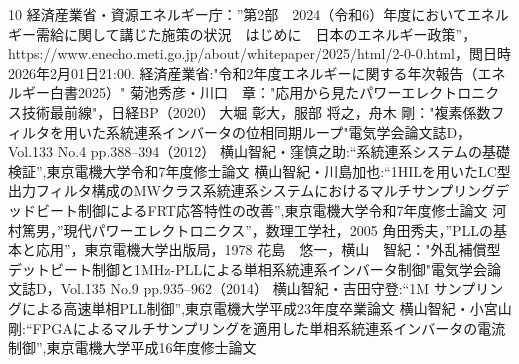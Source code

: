 \documentclass[a4j,11pt,onecolumn,oneside,fleqn,final]{sty_file/s_report}
\begin{document}
\tableofcontents %





%
%
%

\begin{thebibliography}{10}
経済産業省・資源エネルギー庁：”第2部　2024（令和6）年度においてエネルギー需給に関して講じた施策の状況　はじめに　日本のエネルギー政策”，\\https://www.enecho.meti.go.jp/about/whitepaper/2025/html/2-0-0.html，閲日時2026年2月01日21:00.
経済産業省:"令和2年度エネルギーに関する年次報告（エネルギー白書2025）"
菊池秀彦・川口　章："応用から見たパワーエレクトロニクス技術最前線"，日経BP（2020）   
大堀 彰大，服部 将之，舟木 剛："複素係数フィルタを用いた系統連系インバータの位相同期ループ"電気学会論文誌D，Vol.133 No.4 pp.388–394（2012）
横山智紀・窪慎之助:“系統連系システムの基礎検証”,東京電機大学令和7年度修士論文
横山智紀・川島加也:“1HILを用いたLC型出力フィルタ構成のMWクラス系統連系システムにおけるマルチサンプリングデッドビート制御によるFRT応答特性の改善”,東京電機大学令和7年度修士論文
河村篤男，”現代パワーエレクトロニクス”，数理工学社，2005
角田秀夫，”PLLの基本と応用”，東京電機大学出版局，1978
花島　悠一，横山　智紀："外乱補償型デットビート制御と1MHz-PLLによる単相系統連系インバータ制御"電気学会論文誌D，Vol.135 No.9 pp.935–962（2014）
横山智紀・吉田守登:“1M サンプリングによる高速単相PLL制御”,東京電機大学平成23年度卒業論文
横山智紀・小宮山　剛:“FPGAによるマルチサンプリングを適用した単相系統連系インバータの電流制御”,東京電機大学平成16年度修士論文

\end{thebibliography}
 
\end{document}
